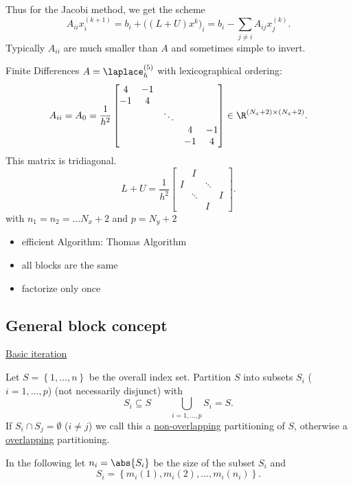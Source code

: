 Thus for the Jacobi method, we get the scheme
\[
	A_{ii}x_{i}^{(k+1)} = b_{i}+\Big( (L+U)x^{k} \Big) _{i} = b_{i} - \sum_{j \neq i}^{}{A_{ij}x_{j}^{(k)}}
.\] 
Typically $A_{ii}$ are much smaller than $A$ and sometimes simple to invert.
\begin{exam}
	Finite Differences $A=\laplace_{h}^{(5)}$ with lexicographical ordering:
	\[
	A_{ii} = A_{0} = \frac{1}{h^2}\begin{bmatrix}
		4 & -1 \\
		-1 & 4 \\
		&&\ddots \\
		&&&4& -1\\
		&&&-1 & 4
	\end{bmatrix}
	\in \R^{(N_{x}+2) \times (N_{x} +2)}
	.\] 
	This matrix is tridiagonal.
	\[
	L+U = \frac{1}{h^2}\begin{bmatrix}
	& I \\
	I && \ddots \\
  	&\ddots &&I \\
	&&I
	\end{bmatrix}
	.\] 
	with $n_1 = n_2 = \ldots  N_{x} +2$ and $p=N_{y}+2$

	\begin{itemize}
		\item efficient Algorithm: Thomas Algorithm
		\item all blocks are the same
		\item factorize only once
	\end{itemize}
\end{exam}

\subsection{General block concept}
\label{sec:General block concept}

\underline{Basic iteration}

Let $S=\left\{ 1, \ldots, n \right\} $ be the overall index set. Partition $S$ into subsets $S_{i}$ ($i=1, \ldots, p$) (not necessarily disjunct) with
\[
S_{i}\subseteq S \qquad \bigcup_{i=1, \ldots, p}S_{i} = S
.\] 
If $S_{i}\cap S_{j} = \emptyset$ ($i \neq j$) we call this a \underline{non-overlapping} partitioning of $S$, otherwise a \underline{overlapping} partitioning.\enter

In the following let $n_{i}= \abs{S_{i}} $ be the size of the subset $S_{i}$ and 
\[
S_{i}= \left\{ m_{i}(1), m_{i}(2), \ldots , m_{i}(n_{i}) \right\} 
.\] 

